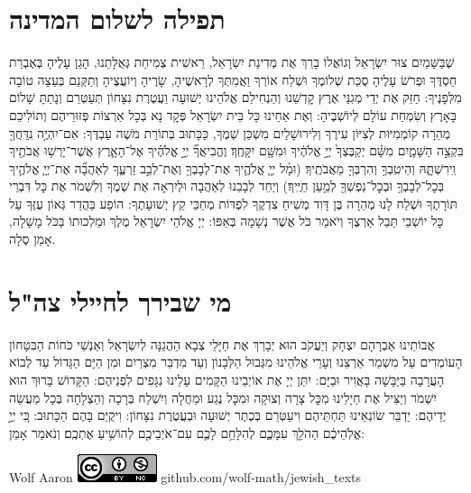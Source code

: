 \documentclass[a4paper, twoside, openany, parskip=half, 10pt]{article}
\begin{document}
\section*{תפילה לשלום המדינה}
\vspace{-.5\baselineskip}
\begin{multicols}{2}
 שֶׁבַּשָּׁמַיִם צוּר יִשְׂרָאֵל וְגוֹאֲלוֹ בָּרֵךְ אֶת מְדִינַת יִשְׂרָאֵל, רֵאשִׁית צְמִיחַת גְּאֻלָּתֵנוּ, הָגֵן עָלֶיהָ בְּאֶבְרַת חַסְדֶּךָ וּפְרֹשׂ עָלֶיהָ סֻכַּת שְׁלוֹמֶךָ וּשְׁלַח אוֹרְךָ וַאֲמִתְּךָ לְרָאשֶׁיהָ, שָׂרֶיהָ וְיוֹעֲצֶיהָ וְתַקְּנֵם בְּעֵצָה טוֹבָה מִלְּפָנֶיךָ: חַזֵּק אֶת יְדֵי מְגִנֵּי אֶרֶץ קׇדְשֵׁנוּ וְהַנְחִילֵם אֱלֹהֵינוּ יְשׁוּעָה וַעֲטֶרֶת נִצָּחוֹן תְּעַטְּרֵם וְנָתַתָּ שָׁלוֹם בָּאָרֶץ וְשִׂמְחַת עוֹלָם לְיוֹשְׁבֶיהָ:
וְאֶת אַחֵינוּ כָּל בֵּית יִשְׂרָאֵל פְּקׇד נָא בְּכָל אַרְצוֹת פְּזוּרֵיהֶם וְתוֹלִיכֵם מְהֵרָה קוֹמְמִיּוּת לְצִיּוֹן עִירֶךָ וְלִירוּשָׁלַיִם מִשְׁכַּן שְׁמֶךָ, כַּכָּתוּב בְּתוֹרַת מֹשֶׁה עַבְדֶּךָ:
אִם־יִהְיֶ֥ה נִֽדַּחֲךָ֖ בִּקְצֵ֣ה הַשָּׁמָ֑יִם מִשָּׁ֗ם יְקַבֶּצְךָ֙ יְיָ֣ אֱלֹהֶ֔יךָ וּמִשָּׁ֖ם יִקָּחֶֽךָ׃
וֶהֱבִיאֲךָ֞ יְיָ֣ אֱלֹהֶ֗יךָ אֶל־הָאָ֛רֶץ אֲשֶׁר־יָרְשׁ֥וּ אֲבֹתֶ֖יךָ וִֽירִשְׁתָּ֑הּ וְהֵיטִֽבְךָ֥ וְהִרְבְּךָ֖ מֵאֲבֹתֶֽיךָ׃ 
(וּמָ֨ל יְיָ֧ אֱלֹהֶ֛יךָ אֶת־לְבָבְךָ֖ וְאֶת־לְבַ֣ב זַרְעֶ֑ךָ לְאַהֲבָ֞ה אֶת־יְיָ֧ אֱלֹהֶ֛יךָ בְּכׇל־לְבָבְךָ֥ וּבְכׇל־נַפְשְׁךָ֖ לְמַ֥עַן חַיֶּֽיךָ׃)
וְיַחֵד לְבָבֵנוּ לְאַהֲבָה וּלְיִרְאָה אֶת שְׁמֶךָ וְלִשְׁמֹר אֶת כׇּל דִּבְרֵי תּוֹרָתֶךָ וּשְׁלַח לָנוּ מְהֵרָה בֶּן דָּוִד מְשִׁיחַ צִדְקֶךָ לִפְדּוֹת מְחַכֵּי קֵץ יְשׁוּעָתֶךָ: הוֹפַע בַּהֲדַר גְּאוֹן עֻזֶּךָ עַל כׇּל יוֹשְׁבֵי תֵּבֵל אַרְצֶךָ וְיֹאמַר כֹּל אֲשֶׁר נְשָׁמָה בְּאַפּוֹ:
יְיָ אֱלֹהֵי יִשְׂרָאֵל מֶלֶךְ וּמַלְכוּתוֹ בַּכֹּל מָשָׁלָה, אָמֵן סֶלָה. 
\end{multicols}

\section*{מי שבירך לחיילי צה"ל}
\vspace{-.5\baselineskip}
\begin{multicols}{2}
אֲבוֹתֵינוּ אַבְרָהָם יִצְחָק וְיַעֲקֹב הוּא יְבָרֵךְ אֶת חַיָּלֵי צְבָא הַהֲגַנָּה לְיִשְׂרָאֵל וְאַנְשֵׁי כֹּחוֹת הַבִּטָּחוֹן הָעוֹמְדִים עַל מִשְׁמַר אַרְצֵנוּ וְעָרֵי אֱלֹהֵינוּ מִגְּבוּל הַלְּבָנוֹן וְעַד מִדְבַּר מִצְרַיִם וּמִן הַיָּם הַגָּדוֹל עַד לְבוֹא הָעֲרָבָה בַּיַּבָּשָׁה בָּאֲוִיר וּבַיָּם:
    יִתֵּן יְיָ אֶת אוֹיְבֵינוּ הַקָּמִים עָלֵינוּ נִגָּפִים לִפְנֵיהֶם: הַקָּדוֹשׁ בָּרוּךְ הוּא יִשְׁמֹר וְיַצִּיל אֶת חַיָלֵינוּ מִכׇּל צָרָה וְצוּקָה וּמִכׇּל נֶגַע וּמַחֲלָה וְיִשְׁלַח בְּרָכָה וְהַצְלָחָה בְּכָל מַעֲשֵׂה יְדֵיהֶם: יַדְבֵּר שׂוֹנְאֵינוּ תַּחְתֵּיהֶם וִיעַטְּרֵם בְּכֶתֶר יְשׁוּעָה וּבְעֲטֶרֶת נִצָּחוֹן: וִיקֻיַּם בָּהֶם הַכָּתוּב: כִּ֚י יְיָ֣ אֱלֹֽהֵיכֶ֔ם הַהֹלֵ֖ךְ עִמָּכֶ֑ם לְהִלָּחֵ֥ם לָכֶ֛ם עִם־אֹיְבֵיכֶ֖ם לְהוֹשִׁ֥יעַ אֶתְכֶֽם׃ 
 וְנֹאמַר אָמֵן:
\end{multicols}

\vfill

Wolf Aaron
\includegraphics[scale=.5]{images/cc.png}
github.com/wolf-math/jewish\_texts
\end{document}
